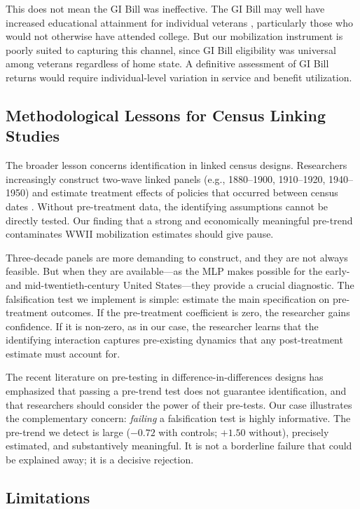 \documentclass[12pt]{article}
\begin{document}
This does not mean the GI Bill was ineffective. The GI Bill may well have increased educational attainment for individual veterans \citep{boundturner2002}, particularly those who would not otherwise have attended college. But our mobilization instrument is poorly suited to capturing this channel, since GI Bill eligibility was universal among veterans regardless of home state. A definitive assessment of GI Bill returns would require individual-level variation in service and benefit utilization.

\subsection{Methodological Lessons for Census Linking Studies}

The broader lesson concerns identification in linked census designs. Researchers increasingly construct two-wave linked panels (e.g., 1880--1900, 1910--1920, 1940--1950) and estimate treatment effects of policies that occurred between census dates \citep{abramitzky2012, long2009, ward2023}. Without pre-treatment data, the identifying assumptions cannot be directly tested. Our finding that a strong and economically meaningful pre-trend contaminates WWII mobilization estimates should give pause.

Three-decade panels are more demanding to construct, and they are not always feasible. But when they are available---as the MLP makes possible for the early- and mid-twentieth-century United States---they provide a crucial diagnostic. The falsification test we implement is simple: estimate the main specification on pre-treatment outcomes. If the pre-treatment coefficient is zero, the researcher gains confidence. If it is non-zero, as in our case, the researcher learns that the identifying interaction captures pre-existing dynamics that any post-treatment estimate must account for.

The recent literature on pre-testing in difference-in-differences designs \citep{roth2023, rambachan2023} has emphasized that passing a pre-trend test does not guarantee identification, and that researchers should consider the power of their pre-tests. Our case illustrates the complementary concern: \textit{failing} a falsification test is highly informative. The pre-trend we detect is large ($-0.72$ with controls; $+1.50$ without), precisely estimated, and substantively meaningful. It is not a borderline failure that could be explained away; it is a decisive rejection.

\subsection{Limitations}
\end{document}
